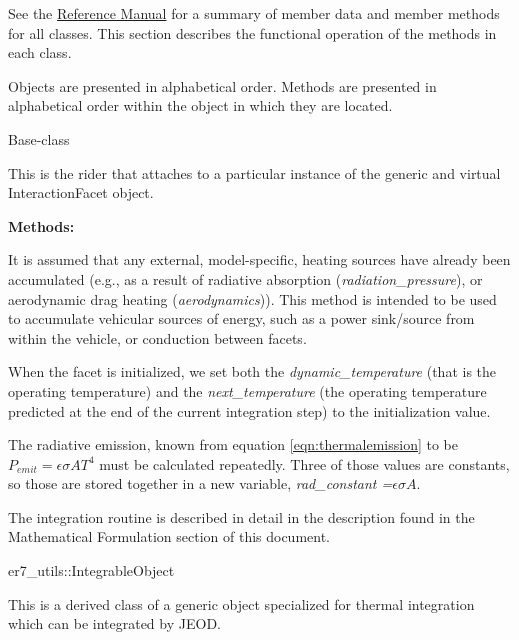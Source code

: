 See the \href{file:refman.pdf}{Reference Manual}\cite{thermalbib:ReferenceManual} for a summary of member data and member methods for all classes.  This section describes the functional operation of the methods in each class.

Objects are presented in alphabetical order.
Methods are presented in alphabetical order within the object in
which they are located.  

\begin{enumerate}
 Base-class

This is the rider that attaches to a particular instance of the
generic and virtual InteractionFacet object.

{\bf Methods:}

\begin{enumerate}

\label{ref:facetaccumulatethermalsources}

It is assumed that any external, model-specific, heating sources have
already been accumulated (e.g., as a result of radiative absorption
(\textit{radiation\_pressure}), or aerodynamic drag heating
(\textit{aerodynamics})).  This method is intended to be used to
accumulate vehicular sources of energy, such as a power sink/source
from within the vehicle, or conduction between facets.

\label{ref:facetinitialize}
When the facet is initialized, we set both the
\textit{dynamic\_temperature}
(that is the operating temperature) and the
\textit{next\_temperature} (the operating temperature predicted at
the end of the current integration step) to the initialization value.

The radiative emission, known from equation \ref{eqn:thermalemission} to be 
$P_{emit} = \epsilon \sigma A T^4$ must be
calculated repeatedly.  Three of those values are constants, so those
are stored together in a new variable, \textit{rad\_constant
=}$\epsilon \sigma A$.


\label{ref:facetintegrate}
The integration routine is described in detail in the
 description found in
the Mathematical Formulation section of this document.
\end{enumerate}


er7\_utils::IntegrableObject 

This is a derived class of a generic object specialized for thermal
integration which can be integrated by JEOD.


\end{enumerate}
